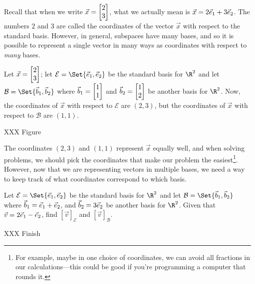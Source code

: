 
Recall that when we write $\vec x=\mat{2\\3}$, what we actually mean is $\vec x=2{\vec e_1}+3{\vec e_2}$. The numbers $2$
and $3$ are called the coordinates of the vector $\vec x$ with respect to the standard basis.  However, in general,
subspaces have many bases, and so it is possible to represent a single vector in many ways as coordinates with
respect to \emph{many} bases.

Let $\vec x=\mat{2\\3}$; let $\mathcal E=\Set{\xhat,\yhat}$ be the standard basis for $\R^2$ and let
$\mathcal B=\Set{\vec b_1,\vec b_2}$ where $\vec b_1=\mat{1\\1}$ and $\vec b_2=\mat{1\\2}$ be another
basis for $\R^2$. Now, the coordinates of $\vec x$ with respect to $\mathcal E$ are $(2,3)$, but
the coordinates of $\vec x$ with respect to $\mathcal B$ are $(1,1)$.

XXX Figure

The coordinates $(2,3)$ and $(1,1)$ represent $\vec x$ equally well, and when solving problems, we should pick the
coordinates that make our problem the easiest\footnote{ For example, maybe in one choice of coordinates, we can avoid all 
fractions in our calculations---this could be good if you're programming a computer that rounds it.}. However, now that we
are representing vectors in multiple bases, we need a way to keep track of what coordinates correspond to which basis.


\begin{example}
	Let $\mathcal E=\Set{\xhat,\yhat}$ be the standard basis for $\R^2$ and let $\mathcal B=\Set{\vec b_1,\vec b_2}$
	where $\vec b_1={\vec e_1}+{\vec e_2}$, and $\vec b_2 =3{\vec e_2}$ be another basis for $\R^2$. Given that $\vec v=2{\vec e_1}-{\vec e_2}$, 
	find $[\vec v]_{\mathcal E}$ and $[\vec v]_{\mathcal B}$.

	XXX Finish
\end{example}

